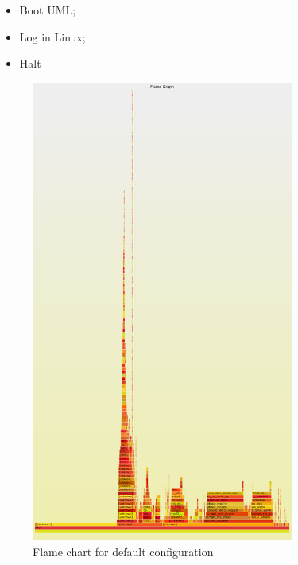 \begin{itemize}
\item Boot UML;
\item Log in Linux;
\item Halt
\end{itemize}

\begin{figure}[!htb]
\centering
\includegraphics[width=3.4in]{0.png}
\caption{\label{fig:flame0}Flame chart for default configuration}
\end{figure}

